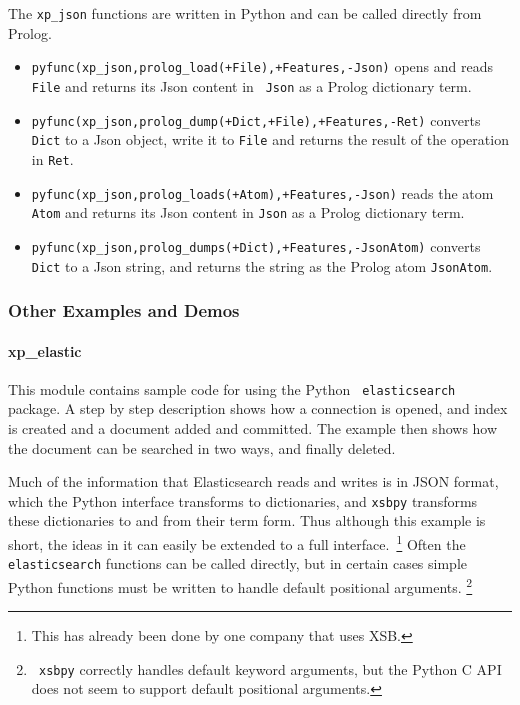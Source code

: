 The {\tt xp\_json} functions are written in Python and can be
called directly from Prolog.
\begin{itemize}
\item {\tt pyfunc(xp\_json,prolog\_load(+File),+Features,-Json)}
  opens and reads {\tt File} and returns its Json content in {\tt
    Json} as a Prolog dictionary term.
\item {\tt pyfunc(xp\_json,prolog\_dump(+Dict,+File),+Features,-Ret)}
  converts {\tt Dict} to a Json object, write it to {\tt File} and
  returns the result of the operation in {\tt Ret}.
\item {\tt pyfunc(xp\_json,prolog\_loads(+Atom),+Features,-Json)}
  reads the atom {\tt Atom} and returns its Json content in {\tt Json}
  as a Prolog dictionary term.
\item {\tt  pyfunc(xp\_json,prolog\_dumps(+Dict),+Features,-JsonAtom)}
  converts {\tt Dict} to a Json string, and returns the string as the
  Prolog atom {\tt JsonAtom}.
\end{itemize}  

\subsubsection{Other Examples and Demos}

\paragraph{xp\_elastic}
This module contains sample code for using the Python {\tt
  elasticsearch} package.  A step by step description shows how a
connection is opened, and index is created and a document added and
committed.  The example then shows how the document can be searched in
two ways, and finally deleted.

Much of the information that Elasticsearch reads and writes is in JSON
format, which the Python interface transforms to dictionaries, and
{\tt xsbpy} transforms these dictionaries to and from their term form.
Thus although this example is short, the ideas in it can easily be
extended to a full interface.~\footnote{This has already been done by
  one company that uses XSB.}  Often the {\tt elasticsearch} functions
can be called directly, but in certain cases simple Python functions
must be written to handle default positional arguments. \footnote{{\tt
    xsbpy} correctly handles default keyword arguments, but the Python
  C API does not seem to support default positional arguments.}

